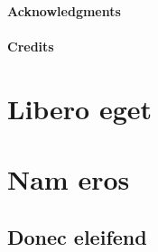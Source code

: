 




\frontmatter

\renewcommand{\hbTitle}{Placeholder Title \protect\\ That is kind of long}
\renewcommand{\hbSubtitle}{This skeleton file created by Artefact2. \protect\\ \url{https://github.com/Artefact2/texbrew/}}
\renewcommand*{\hbCoverFile}{assets/samples/cover}
\hbMakecover

\renewcommand*{\hbSubcoverFile}{assets/samples/cover2}
\hbMakesubcover

\paragraph*{Acknowledgments} {\footnotesize \lipsum[100-101]}

\paragraph*{Credits}

{\footnotesize
\begin{itemize}

\end{itemize}}

\clearpage
\tableofcontents*

\mainmatter


 \lipsum[104-108]


 \lipsum[110-115]

\section*{Libero eget} \lipsum[116-118]
\section*{Nam eros} \lipsum[119-120]
\subsection*{Donec eleifend} \lipsum[120-123]
